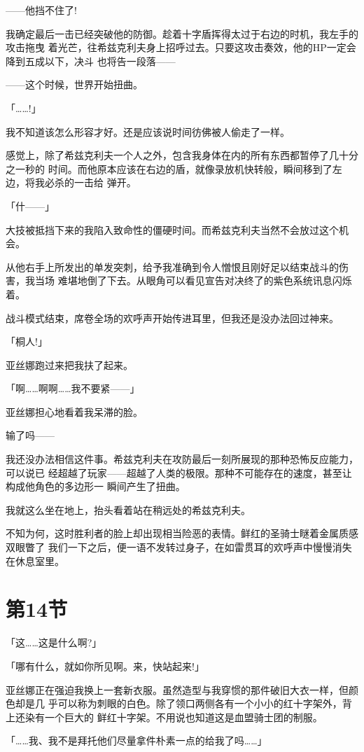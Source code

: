 \documentclass[11pt]{book}
\begin{document}
——他挡不住了!

我确定最后一击已经突破他的防御。趁着十字盾挥得太过于右边的时机，我左手的攻击拖曳
着光芒，往希兹克利夫身上招呼过去。只要这攻击奏效，他的HP一定会降到五成以下，决斗
也将告一段落——

——这个时候，世界开始扭曲。

「……!」

我不知道该怎么形容才好。还是应该说时间彷佛被人偷走了一样。

感觉上，除了希兹克利夫一个人之外，包含我身体在内的所有东西都暂停了几十分之一秒的
时间。而他原本应该在右边的盾，就像录放机快转般，瞬间移到了左边，将我必杀的一击给
弹开。

「什——」

大技被抵挡下来的我陷入致命性的僵硬时间。而希兹克利夫当然不会放过这个机会。

从他右手上所发出的单发突刺，给予我准确到令人憎恨且刚好足以结束战斗的伤害，我当场
难堪地倒了下去。从眼角可以看见宣告对决终了的紫色系统讯息闪烁着。

战斗模式结束，席卷全场的欢呼声开始传进耳里，但我还是没办法回过神来。

「桐人!」

亚丝娜跑过来把我扶了起来。

「啊……啊啊……我不要紧——」

亚丝娜担心地看着我呆滞的脸。

输了吗——

我还没办法相信这件事。希兹克利夫在攻防最后一刻所展现的那种恐怖反应能力，可以说已
经超越了玩家——超越了人类的极限。那种不可能存在的速度，甚至让构成他角色的多边形一
瞬间产生了扭曲。

我就这么坐在地上，抬头看着站在稍远处的希兹克利夫。

不知为何，这时胜利者的脸上却出现相当险恶的表情。鲜红的圣骑士瞇着金属质感双眼瞥了
我们一下之后，便一语不发转过身子，在如雷贯耳的欢呼声中慢慢消失在休息室里。
\section{第14节}
\label{sec:org6950a96}
「这……这是什么啊?」

「哪有什么，就如你所见啊。来，快站起来!」

亚丝娜正在强迫我换上一套新衣服。虽然造型与我穿惯的那件破旧大衣一样，但颜色却是几
乎可以称为刺眼的白色。除了领口两侧各有一个小小的红十字架外，背上还染有一个巨大的
鲜红十字架。不用说也知道这是血盟骑士团的制服。

「……我、我不是拜托他们尽量拿件朴素一点的给我了吗……」
\end{document}
